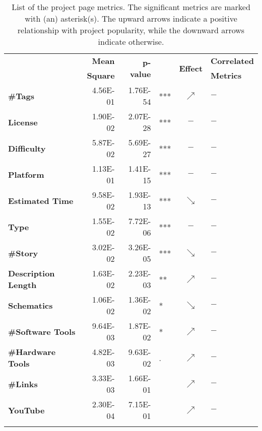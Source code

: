 \begin{table}[t]
\centering
\caption{List of the project page metrics. The significant metrics are marked with (an) asterisk(s). The upward arrows indicate a positive relationship with project popularity, while the downward arrows indicate otherwise.}
	\setlength{\tabcolsep}{3.8pt}
\label{table:RQ1}
\begin{tabular}{|>{\bfseries}l|r|rl|c|l|}
	\hline
\multirow{2}{*}{Metric} & \textbf{Mean}  & \multirow{2}{*}{\textbf{p-value}}  &     & \multirow{2}{*}{\textbf{Effect}}     &\textbf{Correlated}\\
&\textbf{Square}&& &&\textbf{Metrics} \\
	\hline	\hline
\#Tags                 & 4.56E-01 & 1.76E-54 & *** & $\nearrow$ & $-$                  \\
License                & 1.90E-02 & 2.07E-28 & *** & $-$        & $-$                  \\
Difficulty             & 5.87E-02 & 5.69E-27 & *** & $-$        & $-$                  \\
Platform               & 1.13E-01 & 1.41E-15 & *** & $-$ & $-$                  \\
Estimated Time        & 9.58E-02 & 1.93E-13 & *** & $\searrow$ & $-$                  \\
Type                   & 1.55E-02 & 7.72E-06 & *** & $-$        & $-$                  \\
\#Story                & 3.02E-02 & 3.26E-05 & *** & $\searrow$ & $-$                  \\
Description Length    & 1.63E-02 & 2.23E-03 & **  & $\nearrow$ & $-$                  \\
Schematics & 1.06E-02 & 1.36E-02 & *   & $\searrow$ & $-$                  \\
\#Software Tools             & 9.64E-03 & 1.87E-02 & *   & $\nearrow$ & $-$                  \\
\#Hardware Tools            & 4.82E-03 & 9.63E-02 & .   & $\nearrow$ & $-$                  \\
\#Links                & 3.33E-03 & 1.66E-01 &     & $\nearrow$ & $-$                  \\
YouTube           & 2.30E-04 & 7.15E-01 &     & $\nearrow$ & $-$              \\ \hline
\multicolumn{6}{l}{$p-value$ codes:  `***'$<0$, `**'$<0.001$, `*'$<0.01$, `.'$<0.05$}\\ 
\end{tabular}
\end{table}